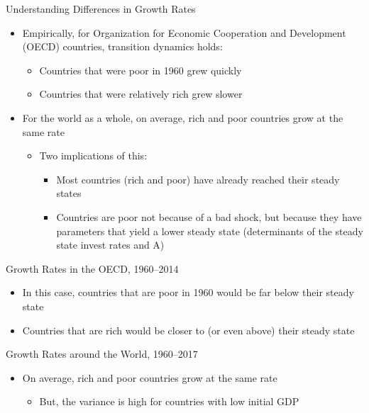 \documentclass[aspectratio=1610]{beamer}
\begin{document}
\begin{frame}[wide]{Understanding Differences in Growth Rates}
	\begin{itemize}
		\item Empirically, for Organization for Economic Cooperation and Development  (OECD) countries, transition dynamics holds:
		\vspace{1mm}
		\begin{itemize}
			\item Countries that were poor in 1960 grew quickly
			\item Countries that were relatively rich grew slower
		\end{itemize}
		\item For the world as a whole, on average, rich and poor countries grow at the same rate
		\vspace{1mm}
		\begin{itemize}
			\item Two implications of this:
			\begin{itemize}
				\item Most countries (rich and poor) have already reached their steady states
				\item Countries are poor not because of a bad shock, but because they have parameters that yield a lower steady state (determinants of the steady state invest rates and A)
			\end{itemize}
		\end{itemize}
	\end{itemize}
\end{frame}

\begin{frame}[wide]{Growth Rates in the OECD, 1960–2014}
	\begin{itemize}
		\item In this case, countries that are poor in 1960 would be far below their steady state
		\item Countries that are rich would be closer to (or even above) their steady state
	\end{itemize}
	\begin{figure}
		\centering
	\end{figure}
	
\end{frame}

\begin{frame}[wide]{Growth Rates around the World, 1960–2017}
	\begin{itemize}
		\item On average, rich and poor countries grow at the same rate
		\begin{itemize}
			\item But, the variance is high for countries with low initial GDP
		\end{itemize}
	\end{itemize}
	\begin{figure}
		\centering
	\end{figure}
	
\end{frame}
\end{document}
